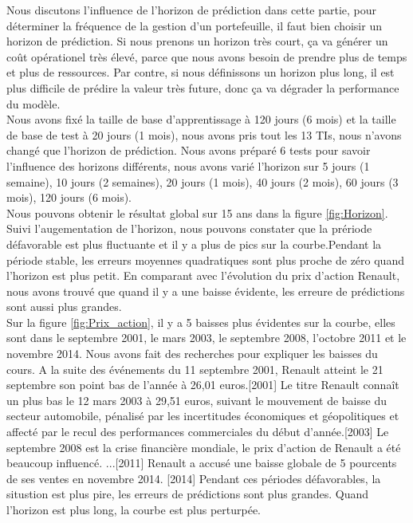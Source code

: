 Nous discutons l'influence de l'horizon de prédiction dans cette partie, pour déterminer la fréquence de la gestion d'un portefeuille, il faut bien choisir un horizon de prédiction. Si nous prenons un horizon très court, ça va générer un coût opérationel très élevé, parce que nous avons besoin de prendre plus de temps et plus de ressources. Par contre, si nous définissons un horizon plus long, il est plus difficile de prédire la valeur très future, donc ça va dégrader la performance du modèle. \\

Nous avons fixé la taille de base d'apprentissage à 120 jours (6 mois) et la taille de base de test à 20 jours (1 mois), nous avons pris tout les 13 TIs, nous n'avons changé que l'horizon de prédiction. Nous avons préparé 6 tests pour savoir l'influence des horizons différents, nous avons varié l'horizon sur 5 jours (1 semaine), 10 jours (2 semaines), 20 jours (1 mois), 40 jours (2 mois), 60 jours (3 mois), 120 jours (6 mois). \\

Nous pouvons obtenir le résultat global sur 15 ans dans la figure \ref{fig:Horizon}. Suivi l'augementation de l'horizon, nous pouvons constater que la prériode défavorable est plus fluctuante et il y a plus de pics sur la courbe.Pendant la période stable, les erreurs moyennes quadratiques sont plus proche de zéro quand l'horizon est plus petit. En comparant avec l'évolution du prix d'action Renault, nous avons trouvé que quand il y a une baisse évidente, les erreure de prédictions sont aussi plus grandes. \\

Sur la figure \ref{fig:Prix_action}, il y a 5 baisses plus évidentes sur la courbe, elles sont dans le septembre 2001, le mars 2003, le septembre 2008, l'octobre 2011 et le novembre 2014. Nous avons fait des recherches pour expliquer les baisses du cours. A la suite des événements du 11 septembre 2001, Renault atteint le 21 septembre son point bas de l'année à 26,01 euros.[2001] Le titre Renault connaît un plus bas le 12 mars 2003 à 29,51 euros, suivant le mouvement de baisse du secteur automobile, pénalisé par les incertitudes économiques et géopolitiques et affecté par le recul des performances commerciales du début d’année.[2003] Le septembre 2008 est la crise financière mondiale, le prix d'action de Renault a été beaucoup influencé. ...[2011] Renault a accusé une baisse globale de 5 pourcents de ses ventes en novembre 2014. [2014] Pendant ces périodes défavorables, la situstion est plus pire, les erreurs de prédictions sont plus grandes. Quand l'horizon est plus long, la courbe est plus perturpée. \\ 


